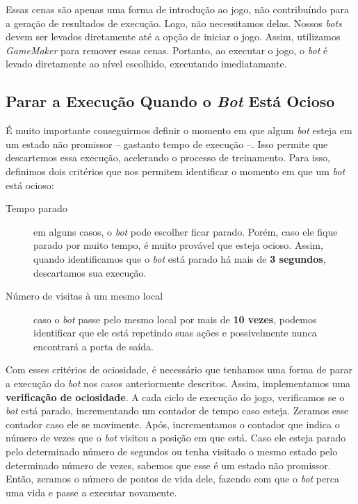 Essas cenas são apenas uma forma de introdução ao jogo, não contribuíndo para a
geração de resultados de execução. Logo, não necessitamos delas. Nossos
\textit{bots} devem ser levados diretamente até a opção de iniciar o jogo.
Assim, utilizamos \textit{GameMaker} para remover essas cenas. Portanto, ao
executar o jogo, o \textit{bot} é levado diretamente ao nível escolhido,
executando imediatamante.

\subsection{Parar a Execução Quando o \textit{Bot} Está Ocioso}

É muito importante conseguirmos definir o momento em que algum \textit{bot}
esteja em um estado não promissor -- gastanto tempo de execução --. Isso
permite que descartemos essa execução, acelerando o processo de treinamento.
Para isso, definimos dois critérios que nos permitem identificar o momento em
que um \textit{bot} está ocioso:

\begin{description}
    \item [Tempo parado] em alguns casos, o \textit{bot} pode escolher ficar
        parado. Porém, caso ele fique parado por muito tempo, é muito provável
        que esteja ocioso. Assim, quando identificamos que o \textit{bot} está
        parado há mais de \textbf{3 segundos}, descartamos sua execução.
    \item [Número de visitas à um mesmo local] caso o \textit{bot} passe pelo
        mesmo local por mais de \textbf{10 vezes}, podemos identificar que ele
        está repetindo suas ações e possivelmente nunca encontrará a porta de
        saída.
\end{description}

Com esses critérios de ociosidade, é necessário que tenhamos uma forma de parar
a execução do \textit{bot} nos casos anteriormente descritos. Assim,
implementamos uma \textbf{verificação de ociosidade}. A cada ciclo de execução
do jogo, verificamos se o \textit{bot} está parado, incrementando um contador
de tempo caso esteja. Zeramos esse contador caso ele se movimente. Após,
incrementamos o contador que indica o número de vezes que o \textit{bot}
visitou a posição em que está. Caso ele esteja parado pelo determinado número
de segundos ou tenha visitado o mesmo estado pelo determinado número de vezes,
sabemos que esse é um estado não promissor. Então, zeramos o número de pontos
de vida dele, fazendo com que o \textit{bot} perca uma vida e passe a executar
novamente.

